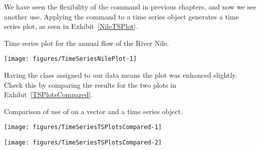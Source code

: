 We have seen the flexibility of the  command in previous chapters, and now we see another use. Applying the  command to a time series object generates a time series plot, as seen in Exhibit~\ref{NileTSPlot}. 
\begin{exhibit} 
\begin{center} 
\caption{Time series plot for the annual flow of the River Nile.} 
\label{NileTSPlot} 
\begin{knitrout}
\color{fgcolor}\begin{kframe}
\begin{alltt}
\hlstd{> } \hlstd{=}\hlstd{,} \hlstd{=}\hlstd{)}
\end{alltt}
\end{kframe}
\texttt{[image: figures/TimeSeriesNilePlot-1]} 

\end{knitrout}
\end{center} 
\end{exhibit} 
 
Having the class assigned to our data means the plot was enhanced slightly. Check this by comparing the results for the two plots in Exhibit~\ref{TSPlotsCompared}. 
\begin{exhibit} 
\begin{center} 
\caption{Comparison of use of  on a vector and a time series object.} 
\label{TSPlotsCompared} 
\begin{knitrout}
\color{fgcolor}\begin{kframe}
\begin{alltt}
\hlstd{> }\hlopt{$} \hlstd{=}\hlstd{)}
\end{alltt}
\end{kframe}
\texttt{[image: figures/TimeSeriesTSPlotsCompared-1]} 
\begin{kframe}\begin{alltt}
\hlstd{> } \hlstd{=}\hlstd{)}
\end{alltt}
\end{kframe}
\texttt{[image: figures/TimeSeriesTSPlotsCompared-2]} 

\end{knitrout}
\end{center} 
\end{exhibit} 
 
